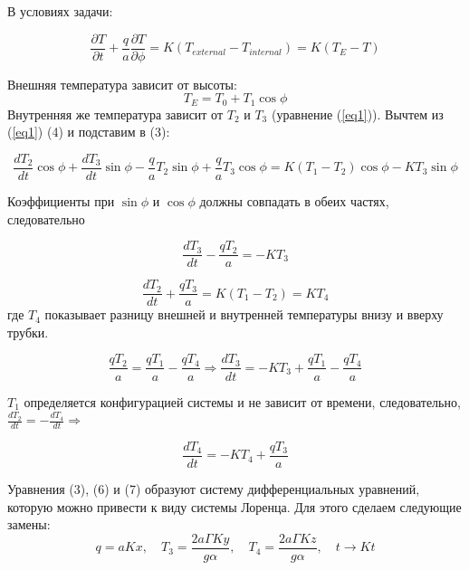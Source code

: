 \documentclass[12pt]{article}
\begin{document}
В условиях задачи:

\begin{equation}\label{eq3}
\frac{\partial T}{\partial t} + \frac{q}{a} \frac{\partial T}{\partial \phi} = K(T_{external}-T_{internal}) = K(T_E-T)
\end{equation}

Внешняя температура зависит от высоты: 
\begin{equation}\label{eq4}
T_E = T_0+T_1\cos\phi
\end{equation}
Внутренняя же температура зависит от $T_2$ и $T_3$ (уравнение (\ref{eq1})). Вычтем из (\ref{eq1}) (4) и подставим в (3):

\begin{equation*}
\frac{dT_2}{dt}\cos\phi + \frac{dT_3}{dt}\sin\phi - \frac{q}{a}T_2\sin\phi + \frac{q}{a}T_3\cos\phi = K(T_1-T_2)\cos\phi-KT_3\sin\phi
\end{equation*}

Коэффициенты при $\sin\phi$ и $\cos\phi$ должны совпадать в обеих частях, следовательно 

\begin{equation*}
\frac{dT_3}{dt} - \frac{qT_2}{a} = -KT_3
\end{equation*}

\begin{equation*}
\frac{dT_2}{dt} + \frac{qT_3}{a} = K(T_1-T_2) = KT_4
\end{equation*}
где $T_4$ показывает разницу внешней и внутренней температуры внизу и вверху трубки.

\begin{equation}\label{eq5}
\frac{qT_2}{a} = \frac{qT_1}{a} - \frac{qT_4}{a} \Longrightarrow \frac{dT_3}{dt} = -KT_3 + \frac{qT_1}{a} - \frac{qT_4}{a}
\end{equation}

$T_1$ определяется конфигурацией системы и не зависит от времени, следовательно, $\frac{dT_2}{dt} = -\frac{dT_4}{dt} \Longrightarrow$

\begin{equation}\label{eq6}
\frac{dT_4}{dt} = -KT_4 + \frac{qT_3}{a}
\end{equation}

Уравнения (3), (6) и (7) образуют систему дифференциальных уравнений, которую можно привести к виду системы Лоренца. Для этого сделаем следующие замены:
\begin{equation*}
q = aKx, \quad T_3 = \frac{2a \Gamma Ky}{g \alpha}, \quad T_4 = \frac{2a \Gamma Kz}{g \alpha}, \quad t \rightarrow Kt
\end{equation*}
\end{document}
